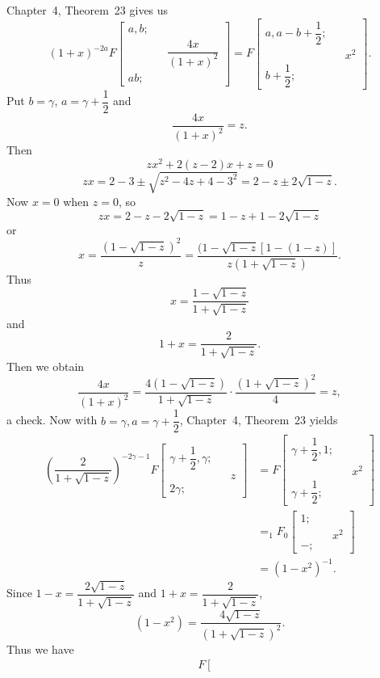 \begin{solution}
Chapter~4, Theorem~23 gives us 
$$(1+x)^{-2a} F \left[ \begin{array}{rlr}
a,b; & & \\
& & \dfrac{4x}{(1+x)^2} \\
ab; & &
\end{array} \right] = F \left[ \begin{array}{rlr}
a, a-b+\dfrac{1}{2}; & & \\
& & x^2 \\
b + \dfrac{1}{2}; & & 
\end{array} \right].$$
Put $b = \gamma$, $a = \gamma + \dfrac{1}{2}$ and
$$\dfrac{4x}{(1+x)^2} = z.$$
Then
$$zx^2+2(z-2)x+z=0$$
$$zx = 2 - 3 \pm \sqrt{z^2-4z+4-3^2} = 2-z \pm 2 \sqrt{1-z}.$$
Now $x=0$ when $z=0$, so
$$zx = 2 - z - 2 \sqrt{1-z} = 1 - z + 1 - 2\sqrt{1-z}$$
or
$$x = \dfrac{(1-\sqrt{1-z})^2}{z} = \dfrac{(1-\sqrt{1-z} [1 - (1-z)]}{z ( 1 + \sqrt{1-z})}.$$
Thus
$$x = \dfrac{1 - \sqrt{1-z}}{1 + \sqrt{1-z}}$$
and
$$1 + x = \dfrac{2}{1+\sqrt{1-z}}.$$
Then we obtain
$$\dfrac{4x}{(1+x)^2} = \dfrac{4(1-\sqrt{1-z})}{1+\sqrt{1-z}} \cdot \dfrac{(1+\sqrt{1-z})^2}{4} = z,$$
a check. 
Now with $b= \gamma, a = \gamma + \dfrac{1}{2}$, Chapter~4, Theorem~23 yields
$$\begin{array}{ll}
\left( \dfrac{2}{1+\sqrt{1-z}} \right)^{-2\gamma-1} F \left[ \begin{array}{rlr}
\gamma + \dfrac{1}{2}, \gamma; & & \\
& & z \\
2 \gamma; & & 
\end{array} \right] &= F \left[ \begin{array}{rlr}
\gamma + \dfrac{1}{2}, 1; & & \\
& & x^2 \\
\gamma + \dfrac{1}{2}; & &
\end{array} \right] \\
&= _1 \!\!F_0 \left[ \begin{array}{rlr}
1; & &\\
& & x^2 \\
-; & &
\end{array} \right] \\
&= (1-x^2)^{-1}.
\end{array}$$
Since $1 - x = \dfrac{2 \sqrt{1-z}}{1 + \sqrt{1-z}}$ and $1 + x = \dfrac{2}{1 + \sqrt{1-z}}$,
$$(1-x^2) = \dfrac{4 \sqrt{1-z}}{(1+\sqrt{1-z})^2}.$$
Thus we have
$$\begin{array}{ll}
F \left[ \begin{array}{rlr}

\end{array}
\end{array}$$
\end{solution}
